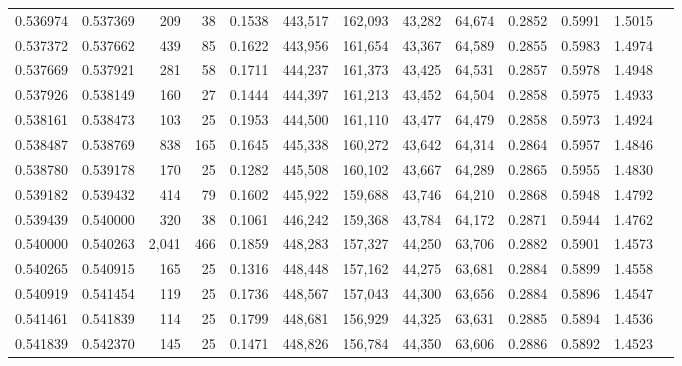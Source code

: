 \begin{tabular}{rrrrrrrrrrrrr}
0.536974 & 0.537369 &   209 &  38 &                                     0.1538 & 443,517 & 162,093 &  43,282 &  64,674 & 0.2852 & 0.5991 & 1.5015 \\
0.537372 & 0.537662 &   439 &  85 &                                     0.1622 & 443,956 & 161,654 &  43,367 &  64,589 & 0.2855 & 0.5983 & 1.4974 \\
0.537669 & 0.537921 &   281 &  58 &                                     0.1711 & 444,237 & 161,373 &  43,425 &  64,531 & 0.2857 & 0.5978 & 1.4948 \\
0.537926 & 0.538149 &   160 &  27 &                                     0.1444 & 444,397 & 161,213 &  43,452 &  64,504 & 0.2858 & 0.5975 & 1.4933 \\
0.538161 & 0.538473 &   103 &  25 &                                     0.1953 & 444,500 & 161,110 &  43,477 &  64,479 & 0.2858 & 0.5973 & 1.4924 \\
0.538487 & 0.538769 &   838 & 165 &                                     0.1645 & 445,338 & 160,272 &  43,642 &  64,314 & 0.2864 & 0.5957 & 1.4846 \\
0.538780 & 0.539178 &   170 &  25 &                                     0.1282 & 445,508 & 160,102 &  43,667 &  64,289 & 0.2865 & 0.5955 & 1.4830 \\
0.539182 & 0.539432 &   414 &  79 &                                     0.1602 & 445,922 & 159,688 &  43,746 &  64,210 & 0.2868 & 0.5948 & 1.4792 \\
0.539439 & 0.540000 &   320 &  38 &                                     0.1061 & 446,242 & 159,368 &  43,784 &  64,172 & 0.2871 & 0.5944 & 1.4762 \\
0.540000 & 0.540263 & 2,041 & 466 &                                     0.1859 & 448,283 & 157,327 &  44,250 &  63,706 & 0.2882 & 0.5901 & 1.4573 \\
0.540265 & 0.540915 &   165 &  25 &                                     0.1316 & 448,448 & 157,162 &  44,275 &  63,681 & 0.2884 & 0.5899 & 1.4558 \\
0.540919 & 0.541454 &   119 &  25 &                                     0.1736 & 448,567 & 157,043 &  44,300 &  63,656 & 0.2884 & 0.5896 & 1.4547 \\
0.541461 & 0.541839 &   114 &  25 &                                     0.1799 & 448,681 & 156,929 &  44,325 &  63,631 & 0.2885 & 0.5894 & 1.4536 \\
0.541839 & 0.542370 &   145 &  25 &                                     0.1471 & 448,826 & 156,784 &  44,350 &  63,606 & 0.2886 & 0.5892 & 1.4523 \\

\end{tabular}
